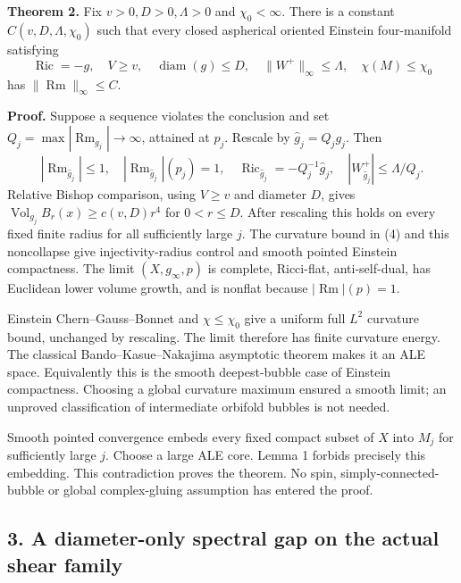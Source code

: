 \documentclass[
  11pt,
]{article}
\begin{document}
\textbf{Theorem 2.} Fix \(v>0,D>0,\Lambda>0\) and \(\chi_0<\infty\).
There is a constant \(C(v,D,\Lambda,\chi_0)\) such that every closed
aspherical oriented Einstein four-manifold satisfying \[
 \operatorname{Ric}=-g,\quad V\ge v,\quad
 \operatorname{diam}(g)\le D,\quad \|W^+\|_\infty\le\Lambda,
 \quad \chi(M)\le\chi_0                                    \tag{3}
\] has \(\|\operatorname{Rm}\|_\infty\le C\).

\textbf{Proof.} Suppose a sequence violates the conclusion and set
\(Q_j=\max|\operatorname{Rm}_{g_j}|\to\infty\), attained at \(p_j\).
Rescale by \(\widehat g_j=Q_jg_j\). Then \[
 |\operatorname{Rm}_{\widehat g_j}|\le1,\quad
 |\operatorname{Rm}_{\widehat g_j}|(p_j)=1,\quad
 \operatorname{Ric}_{\widehat g_j}=-Q_j^{-1}\widehat g_j,
 \quad |W^+_{\widehat g_j}|\le\Lambda/Q_j.                  \tag{4}
\] Relative Bishop comparison, using \(V\ge v\) and diameter \(D\),
gives \(\operatorname{Vol}_{g_j}B_r(x)\ge c(v,D)r^4\) for \(0<r\le D\).
After rescaling this holds on every fixed finite radius for all
sufficiently large \(j\). The curvature bound in (4) and this
noncollapse give injectivity-radius control and smooth pointed Einstein
compactness. The limit \((X,g_\infty,p)\) is complete, Ricci-flat,
anti-self-dual, has Euclidean lower volume growth, and is nonflat
because \(|\operatorname{Rm}|(p)=1\).

Einstein Chern--Gauss--Bonnet and \(\chi\le\chi_0\) give a uniform full
\(L^2\) curvature bound, unchanged by rescaling. The limit therefore has
finite curvature energy. The classical Bando--Kasue--Nakajima asymptotic
theorem makes it an ALE space. Equivalently this is the smooth
deepest-bubble case of Einstein compactness. Choosing a global curvature
maximum ensured a smooth limit; an unproved classification of
intermediate orbifold bubbles is not needed.

Smooth pointed convergence embeds every fixed compact subset of \(X\)
into \(M_j\) for sufficiently large \(j\). Choose a large ALE core.
Lemma 1 forbids precisely this embedding. This contradiction proves the
theorem. No spin, simply-connected-bubble or global complex-gluing
assumption has entered the proof.

\hypertarget{a-diameter-only-spectral-gap-on-the-actual-shear-family}{%
\subsection{3. A diameter-only spectral gap on the actual shear
family}\label{a-diameter-only-spectral-gap-on-the-actual-shear-family}}
\end{document}

